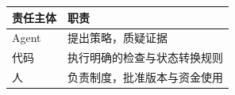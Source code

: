 \begin{tabular}{@{}P{4.0cm}P{8.5cm}@{}}
\toprule
\textbf{责任主体} & \textbf{职责} \\
\midrule
Agent & 提出策略，质疑证据 \\
代码 & 执行明确的检查与状态转换规则 \\
人 & 负责制度，批准版本与资金使用 \\
\bottomrule
\end{tabular}

